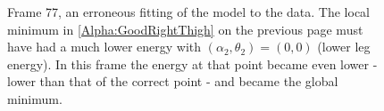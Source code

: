 \begin{figure}[p]
	\qquad
	
	\caption{Frame 77, an erroneous fitting of the model to the data.
		The local minimum in \ref{Alpha:GoodRightThigh} on the previous page must have had a much lower energy with $(\alpha_2, \theta_2) = (0, 0)$ (lower leg energy).
		In this frame the energy at that point became even lower - lower than that of the correct point - and became the global minimum.}
	\label{AlphaBad}
\end{figure}

